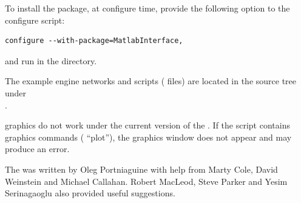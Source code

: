 To install the \mlm{} package, at configure time, provide the following
option to the configure script:
%
\begin{verbatim}
configure --with-package=MatlabInterface,
\end{verbatim}
%
and run  in the  directory.

The example \m{} engine networks and scripts ( files)
are located in the \sr{} source tree under\\
.


\m{} graphics do not work under the current version of the \mlm{}.  If the
script contains graphics commands (\eg{} ``plot''), the \m{} graphics
window does not appear and may produce an error.

\ModuleRefCredits

The \mlm{} was written by Oleg Portniaguine with help from Marty Cole,
David Weinstein and Michael Callahan.  Robert MacLeod, Steve Parker and
Yesim Serinagaoglu also provided useful suggestions.

